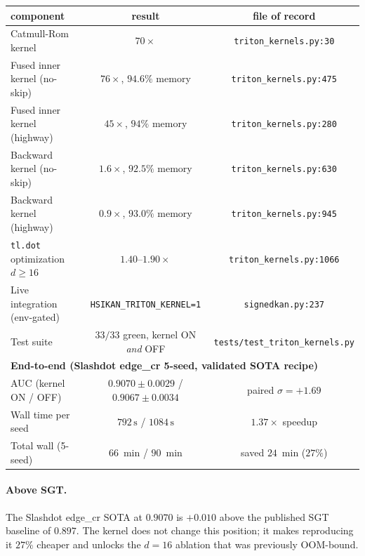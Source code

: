 \documentclass[11pt,a4paper]{article}
\begin{document}
\begin{center}
\begin{tabular}{l c c}
\toprule
\textbf{component} & \textbf{result} & \textbf{file of record} \\
\midrule
Catmull-Rom kernel & $70 \times$ & \texttt{triton\_kernels.py:30} \\
Fused inner kernel (no-skip)        & $76 \times$, $94.6\%$ memory & \texttt{triton\_kernels.py:475} \\
Fused inner kernel (highway)        & $45 \times$, $94\%$ memory   & \texttt{triton\_kernels.py:280} \\
Backward kernel (no-skip)           & $1.6\times$, $92.5\%$ memory & \texttt{triton\_kernels.py:630} \\
Backward kernel (highway)           & $0.9\times$, $93.0\%$ memory & \texttt{triton\_kernels.py:945} \\
\texttt{tl.dot} optimization $d \ge 16$ & $1.40$--$1.90\times$ & \texttt{triton\_kernels.py:1066} \\
Live integration (env-gated) & \texttt{HSIKAN\_TRITON\_KERNEL=1} & \texttt{signedkan.py:237} \\
Test suite                  & $33/33$ green, kernel ON \emph{and} OFF & \texttt{tests/test\_triton\_kernels.py} \\
\midrule
\multicolumn{3}{l}{\bfseries End-to-end (Slashdot edge\_cr 5-seed, validated SOTA recipe)} \\
\midrule
AUC (kernel ON / OFF)               & $0.9070 \pm 0.0029$ / $0.9067 \pm 0.0034$ & paired $\sigma{=}{+}1.69$ \\
Wall time per seed                  & $792 \,\text{s}$ / $1084\,\text{s}$ & $1.37\times$ speedup \\
Total wall (5-seed)                 & $66$~min / $90$~min & saved $24$~min ($27\%$) \\
\bottomrule
\end{tabular}
\end{center}

\paragraph{Above SGT.}
The Slashdot edge\_cr SOTA at $0.9070$ is $+0.010$ above the published
SGT baseline of $0.897$. The kernel does not change this position;
it makes reproducing it $27\%$ cheaper and unlocks the $d{=}16$
ablation that was previously OOM-bound.

\end{document}
